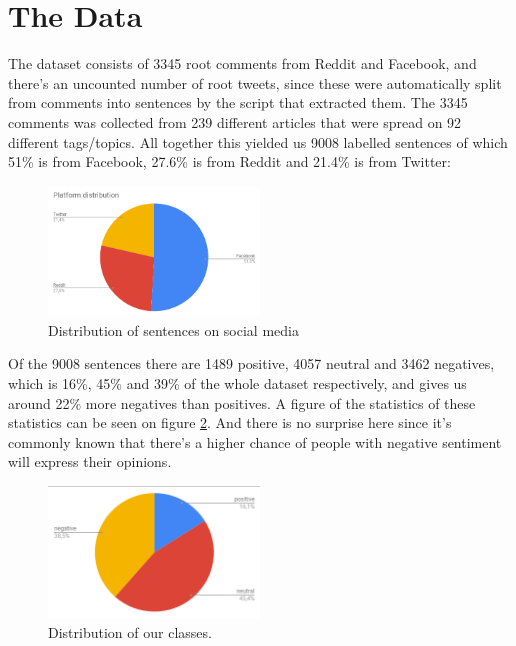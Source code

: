 \section{The Data}

The dataset consists of 3345 root comments from Reddit and Facebook, and there’s an uncounted number of root tweets, since these were automatically split from comments into sentences by the script that extracted them. The 3345 comments was collected from 239 different articles that were spread on 92 different tags/topics. All together this yielded us 9008 labelled sentences of which 51\% is from Facebook, 27.6\% is from Reddit and 21.4\% is from Twitter: 

\begin{figure}[H]
	\includegraphics[width=0.5\textwidth]{Images/DataSetConsistsOf}
	\centering
	\caption{Distribution of sentences on social media}
	\label{datastats}
\end{figure}

Of the 9008 sentences there are 1489 positive, 4057 neutral and 3462 negatives, which is 16\%, 45\% and 39\% of the whole dataset respectively, and gives us around 22\% more negatives than positives.  A figure of the statistics of these statistics can be seen on figure \ref{datastats}. And there is no surprise here since it’s commonly known that there’s a higher chance of people with negative sentiment will express their opinions. \cite{marketing}

\begin{figure}[H]
	\includegraphics[width=0.5\textwidth]{Images/DataStats}
	\centering
	\caption{Distribution of our classes.}
	\label{datastats}
\end{figure}

